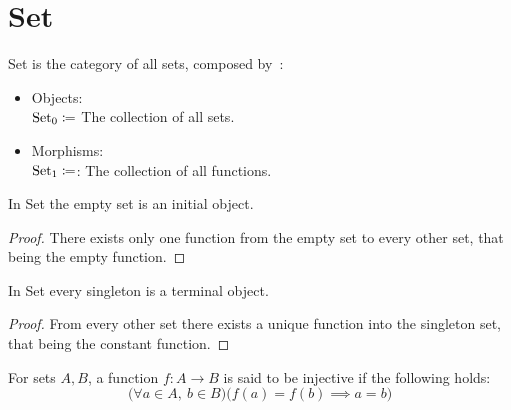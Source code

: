 \section{Set}
\begin{definition}[Set]

  Set is the category of all sets, composed
  by~\parencite[p.~11]{leinster:basic_category_theory}:
  \begin{itemize}
    \item Objects:\\
      $\mathrm{Set}_0\coloneqq$ The collection of all sets.
    \item Morphisms:\\
      $\mathrm{Set}_1\coloneqq$: The collection of all functions.
  \end{itemize}
\end{definition}

\begin{theorem}
  In Set the empty set is an initial object.

  \begin{proof}
    There exists only one function from the empty set to every other set, that
    being the empty function.
  \end{proof}
\end{theorem}

\begin{theorem}
  In Set every singleton is a terminal object.

  \begin{proof}
    From every other set there exists a unique function into the singleton set,
    that being the constant function.
  \end{proof}
\end{theorem}

\begin{definition}

  For sets $A,B$, a function $f:A\to B$ is said to be injective if the following
  holds:
  \[\big(\forall a\in A,\ b\in B\big)\big(f(a)=f(b) \implies a=b\big)\]
\end{definition}

